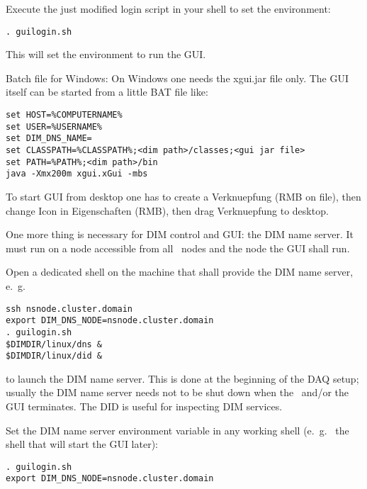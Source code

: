 \item Execute the just modified login script in your shell to set the environment:  
\begin{small}
\begin{verbatim}
. guilogin.sh
\end{verbatim} 
\end{small}
This will set the environment to run the GUI.

\item Batch file for Windows:
On Windows one needs the xgui.jar file only. The GUI itself can be started from a
little BAT file like:
\begin{small}
\begin{verbatim}
set HOST=%COMPUTERNAME% 
set USER=%USERNAME%
set DIM_DNS_NAME=
set CLASSPATH=%CLASSPATH%;<dim path>/classes;<gui jar file>
set PATH=%PATH%;<dim path>/bin
java -Xmx200m xgui.xGui -mbs
\end{verbatim} 
\end{small}
To start GUI from desktop one has to create a Verknuepfung (RMB on file), then change Icon in Eigenschaften (RMB), then drag Verknuepfung to desktop.
\enum


One more thing is necessary for DIM control and GUI: the DIM name server.
It must run on a node accessible from all \mbs\ nodes and the node the GUI shall run. 

\bnum
\item Open a dedicated shell on the machine that shall provide the DIM name server,
e.~g.~ 
\begin{small}
\begin{verbatim}
ssh nsnode.cluster.domain
export DIM_DNS_NODE=nsnode.cluster.domain
. guilogin.sh
$DIMDIR/linux/dns &
$DIMDIR/linux/did &
\end{verbatim} 
\end{small}
to launch the DIM name server. This is done  at the beginning of
the DAQ setup; usually the DIM name server needs not to be shut down 
when the \mbs\ and/or the GUI terminates. The DID is useful for inspecting DIM services.

\item Set the DIM name server environment variable in any working shell (e.~g.~
the shell that will start the GUI later):
\begin{small}
\begin{verbatim}
. guilogin.sh
export DIM_DNS_NODE=nsnode.cluster.domain
\end{verbatim} 
\end{small}

